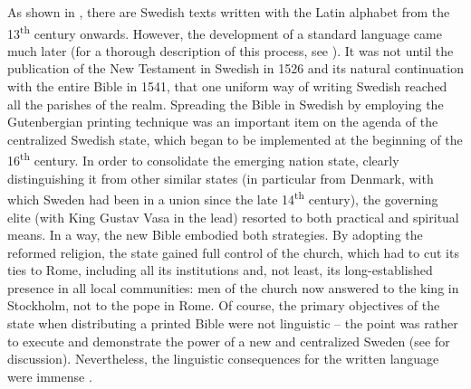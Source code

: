 \documentclass[output=paper]{langscibook}
\begin{document}
As shown in , there are Swedish texts written with the Latin alphabet from the 13\textsuperscript{th} century onwards. However, the development of a standard language came much later (for a thorough description of this process, see \citealt{Teleman2002}). It was not until the publication of the New Testament in Swedish in 1526 and its natural continuation with the entire Bible in 1541, that one uniform way of writing Swedish reached all the parishes of the realm. Spreading the Bible in Swedish by employing the Gutenbergian printing technique was an important item on the agenda of the centralized Swedish state, which began to be implemented at the beginning of the 16\textsuperscript{th} century. In order to consolidate the emerging nation state, clearly distinguishing it from other similar states (in particular from Denmark, with which Sweden had been in a union since the late 14\textsuperscript{th} century), the governing elite (with King Gustav Vasa in the lead) resorted to both practical and spiritual means. In a way, the new Bible embodied both strategies. By adopting the reformed religion, the state gained full control of the church, which had to cut its ties to Rome, including all its institutions and, not least, its long-established presence in all local communities: men of the church now answered to the king in Stockholm, not to the pope in Rome. Of course, the primary objectives of the state when distributing a printed Bible were not linguistic – the point was rather to execute and demonstrate the power of a new and centralized Sweden (see \citealt{Kouri1994} for discussion). Nevertheless, the linguistic consequences for the written language were immense \parencite{Stahle1970}.
\end{document}
